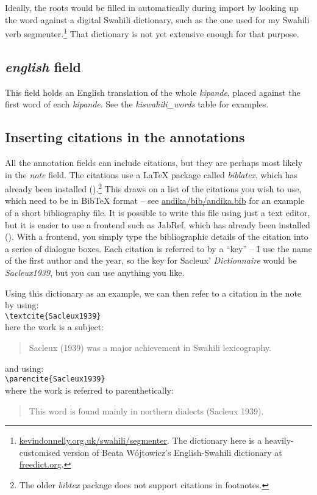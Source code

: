 Ideally, the roots would be filled in automatically during import by looking up the word against a digital Swahili dictionary, such as the one used for my Swahili verb segmenter.\footnote{\url{kevindonnelly.org.uk/swahili/segmenter}.  The dictionary here is a heavily-customised version of Beata Wójtowicz's English-Swahili dictionary at \url{freedict.org}.}  That dictionary is not yet extensive enough for that purpose.

\subsection{\textit{english} field}

This field holds an English translation of the whole \textit{kipande}, placed against the first word of each \textit{kipande}.  See the \textit{kiswahili_words} table for examples.

\subsection{Inserting citations in the annotations}

All the annotation fields can include citations, but they are perhaps most likely in the \textit{note} field.  The citations use a LaTeX package called \textit{biblatex}, which has already been installed ().\footnote{The older \textit{bibtex} package does not support citations in footnotes.}  This draws on a list of the citations you wish to use, which need to be in BibTeX format -- see \url{andika/bib/andika.bib} for an example of a short bibliography file.  It is possible to write this file using just a text editor, but it is easier to use a frontend such as JabRef, which has already been installed ().  With a frontend, you simply type the bibliographic details of the citation into a series of dialogue boxes.  Each citation is referred to by a ``key'' -- I use the name of the first author and the year, so the key for Sacleux' \textit{Dictionnaire} would be \textit{Sacleux1939}, but you can use anything you like.

Using this dictionary as an example, we can then refer to a citation in the note by using:\\
\verb|\textcite{Sacleux1939}|\\
here the work is a subject:
\begin{quotation}
Sacleux (1939) was a major achievement in Swahili lexicography.
\end{quotation}
and using:\\
\verb|\parencite{Sacleux1939}| \\
where the work is referred to parenthetically:
\begin{quotation}
This word is found mainly in northern dialects (Sacleux 1939).
\end{quotation}

